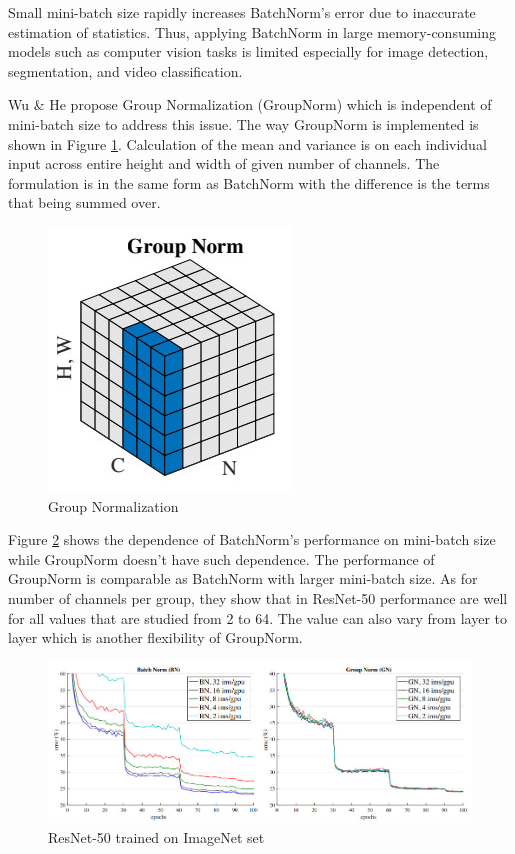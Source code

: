 \documentclass{article}
\begin{document}
Small mini-batch size rapidly increases BatchNorm’s error due to inaccurate estimation of statistics. Thus, applying BatchNorm in large memory-consuming models such as computer vision tasks is limited especially for image detection, segmentation, and video classification. 

Wu \& He propose Group Normalization (GroupNorm) which is independent of mini-batch size to address this issue. The way GroupNorm is implemented is shown in Figure \ref{fig:groupnorm}. Calculation of the mean and variance is on each individual input across entire height and width of given number of channels. The formulation is in the same form as BatchNorm with the difference is the terms that being summed over. 

\begin{figure}[!ht]
	\centering
    \includegraphics[scale=0.7]{pics/batchNorm/GroupNorm.jpg}
	\caption{Group Normalization}
	\label{fig:groupnorm}
\end{figure}

Figure \ref{fig:resnet} shows the dependence of BatchNorm's performance on mini-batch size while GroupNorm doesn't have such dependence. The performance of GroupNorm is comparable as BatchNorm with larger mini-batch size. As for number of channels per group, they show that in ResNet-50 performance are well for all values that are studied from 2 to 64. The value can also vary from layer to layer which is another flexibility of GroupNorm.

\begin{figure}[!ht]
	\centering
    \includegraphics[scale=0.7]{pics/batchNorm/GroupNorm_vs_BatchNorm.jpg}
	\caption{ResNet-50 trained on ImageNet set}
	\label{fig:resnet}
\end{figure}
\end{document}
